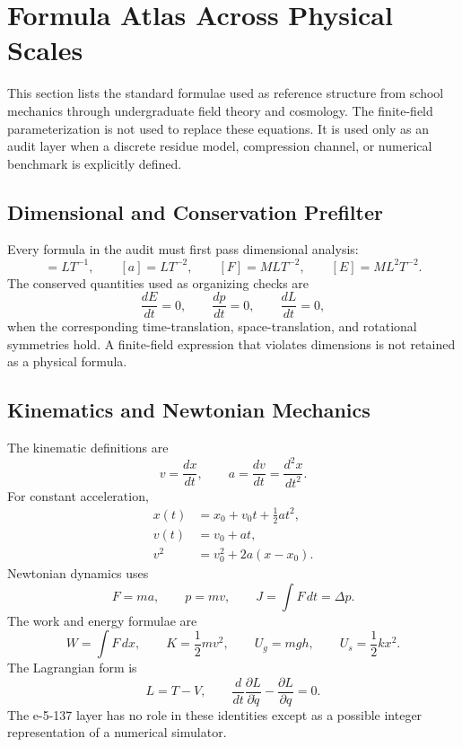 \documentclass[11pt]{article}
\begin{document}
\section{Formula Atlas Across Physical Scales}

This section lists the standard formulae used as reference structure from
school mechanics through undergraduate field theory and cosmology.  The
finite-field parameterization is not used to replace these equations.  It is
used only as an audit layer when a discrete residue model, compression channel,
or numerical benchmark is explicitly defined.

\subsection{Dimensional and Conservation Prefilter}

Every formula in the audit must first pass dimensional analysis:
\begin{equation}
    [v]=LT^{-1},\qquad
    [a]=LT^{-2},\qquad
    [F]=MLT^{-2},\qquad
    [E]=ML^2T^{-2}.
\end{equation}
The conserved quantities used as organizing checks are
\begin{equation}
    \frac{dE}{dt}=0,\qquad
    \frac{dp}{dt}=0,\qquad
    \frac{dL}{dt}=0,
\end{equation}
when the corresponding time-translation, space-translation, and rotational
symmetries hold.  A finite-field expression that violates dimensions is not
retained as a physical formula.

\subsection{Kinematics and Newtonian Mechanics}

The kinematic definitions are
\begin{equation}
    v=\frac{dx}{dt},\qquad
    a=\frac{dv}{dt}=\frac{d^2x}{dt^2}.
\end{equation}
For constant acceleration,
\begin{align}
    x(t)&=x_0+v_0t+\frac{1}{2}at^2,\\
    v(t)&=v_0+at,\\
    v^2&=v_0^2+2a(x-x_0).
\end{align}
Newtonian dynamics uses
\begin{equation}
    F=ma,\qquad p=mv,\qquad J=\int F\,dt=\Delta p.
\end{equation}
The work and energy formulae are
\begin{equation}
    W=\int F\,dx,\qquad
    K=\frac{1}{2}mv^2,\qquad
    U_g=mgh,\qquad
    U_s=\frac{1}{2}kx^2.
\end{equation}
The Lagrangian form is
\begin{equation}
    L=T-V,\qquad
    \frac{d}{dt}\frac{\partial L}{\partial \dot{q}}
    -\frac{\partial L}{\partial q}=0.
\end{equation}
The e-5-137 layer has no role in these identities except as a possible
integer representation of a numerical simulator.
\end{document}
